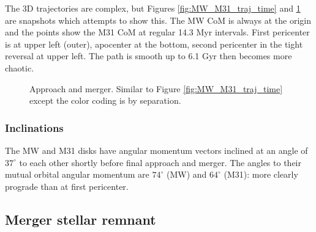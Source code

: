 \documentclass[twocolumn]{aastex63}
\newcommand{\todo}{\color{red}{TODO}\color{black}\hspace{2mm}}
\begin{document}
The 3D trajectories are complex, but Figures \ref{fig:MW_M31_traj_time} and \ref{fig:MW_M31_traj_sep} are snapshots which attempts to show this. The MW CoM is always at the origin and the points show the M31 CoM at regular 14.3 Myr intervals. First pericenter is at upper left (outer), apocenter at the bottom, second pericenter in the tight reversal at upper left. The path is smooth up to 6.1 Gyr then becomes more chaotic.

\begin{figure}[htb!]
	\caption{Approach and merger. Similar to Figure \ref{fig:MW_M31_traj_time} except the color coding is by separation.
		\label{fig:MW_M31_traj_sep}}
\end{figure}


\todo{changes in mass profile}

\subsubsection{Inclinations}

The MW and M31 disks have angular momentum vectors inclined at an angle of $37^\circ$ to each other shortly before final approach and merger. The angles to their mutual orbital angular momentum are $74^\circ$ (MW) and $64^\circ$ (M31): more clearly prograde than at first pericenter.

\todo{discuss implications}

\subsection{Merger stellar remnant}

\end{document}
